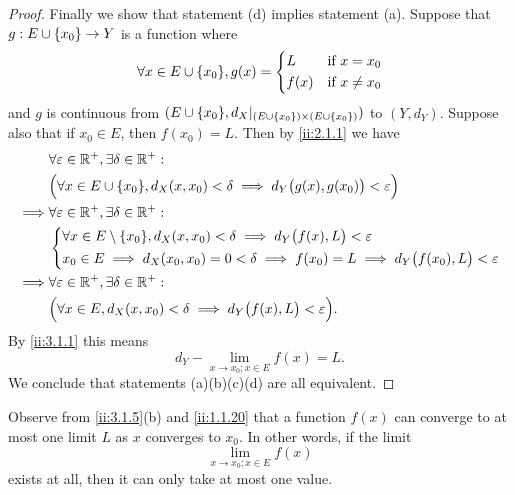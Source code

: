 \begin{proof}
  Finally we show that statement (d) implies statement (a).
  Suppose that \(g : E \cup \left\lbrace x_0\right\rbrace \to Y\) is a function where
  \[
    \forall x \in E \cup \set{x_0}, g(x) = \begin{dcases}
      L    & \text{if } x = x_0    \\
      f(x) & \text{if } x \neq x_0
    \end{dcases}
  \]
  and \(g\) is continuous from \((E \cup \set{x_0}, d_X|_{(E \cup \set{x_0}) \times (E \cup \set{x_0})})\) to \((Y, d_Y)\).
  Suppose also that if \(x_0 \in E\), then \(f(x_0) = L\).
  Then by \cref{ii:2.1.1} we have
  \begin{align*}
             & \forall \varepsilon \in \R^+, \exists \delta \in \R^+ :                                                         \\
             & \Big(\forall x \in E \cup \set{x_0}, d_X(x, x_0) < \delta \implies d_Y\big(g(x), g(x_0)\big) < \varepsilon\Big) \\
    \implies & \forall \varepsilon \in \R^+, \exists \delta \in \R^+ :                                                         \\
             & \begin{dcases}
                 \forall x \in E \setminus \set{x_0}, d_X(x, x_0) < \delta \implies d_Y\big(f(x), L\big) < \varepsilon \\
                 x_0 \in E \implies d_X(x_0, x_0) = 0 < \delta \implies f(x_0) = L \implies d_Y\big(f(x_0), L\big) < \varepsilon
               \end{dcases}  \\
    \implies & \forall \varepsilon \in \R^+, \exists \delta \in \R^+ :                                                         \\
             & \Big(\forall x \in E, d_X(x, x_0) < \delta \implies d_Y\big(f(x), L\big) < \varepsilon\Big).
  \end{align*}
  By \cref{ii:3.1.1} this means
  \[
    d_Y - \lim_{x \to x_0 ; x \in E} f(x) = L.
  \]
  We conclude that statements (a)(b)(c)(d) are all equivalent.
\end{proof}

\begin{rmk}\label{ii:3.1.6}
  Observe from \cref{ii:3.1.5}(b) and \cref{ii:1.1.20} that a function \(f(x)\) can converge to at most one limit \(L\) as \(x\) converges to \(x_0\).
  In other words, if the limit
  \[
    \lim_{x \to x_0 ; x \in E} f(x)
  \]
  exists at all, then it can only take at most one value.
\end{rmk}

